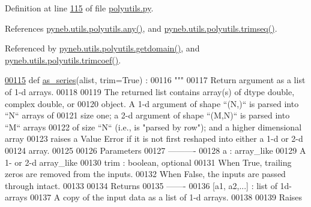 Definition at line \hyperlink{polyutils_8py_source_l00115}{115} of file \hyperlink{polyutils_8py_source}{polyutils.\+py}.



References \hyperlink{polyutils_8py_source_l00076}{pyneb.\+utils.\+polyutils.\+any()}, and \hyperlink{polyutils_8py_source_l00085}{pyneb.\+utils.\+polyutils.\+trimseq()}.



Referenced by \hyperlink{polyutils_8py_source_l00236}{pyneb.\+utils.\+polyutils.\+getdomain()}, and \hyperlink{polyutils_8py_source_l00182}{pyneb.\+utils.\+polyutils.\+trimcoef()}.


\begin{DoxyCode}
\hypertarget{namespacepyneb_1_1utils_1_1polyutils_l00115}{}\hyperlink{namespacepyneb_1_1utils_1_1polyutils_a9c3751d438f0f75922155c7823fe2699}{00115} \textcolor{keyword}{def }\hyperlink{namespacepyneb_1_1utils_1_1polyutils_a9c3751d438f0f75922155c7823fe2699}{as\_series}(alist, trim=True) :
00116     \textcolor{stringliteral}{"""}
00117 \textcolor{stringliteral}{    Return argument as a list of 1-d arrays.}
00118 \textcolor{stringliteral}{}
00119 \textcolor{stringliteral}{    The returned list contains array(s) of dtype double, complex double, or}
00120 \textcolor{stringliteral}{    object.  A 1-d argument of shape ``(N,)`` is parsed into ``N`` arrays of}
00121 \textcolor{stringliteral}{    size one; a 2-d argument of shape ``(M,N)`` is parsed into ``M`` arrays}
00122 \textcolor{stringliteral}{    of size ``N`` (i.e., is "parsed by row"); and a higher dimensional array}
00123 \textcolor{stringliteral}{    raises a Value Error if it is not first reshaped into either a 1-d or 2-d}
00124 \textcolor{stringliteral}{    array.}
00125 \textcolor{stringliteral}{}
00126 \textcolor{stringliteral}{    Parameters}
00127 \textcolor{stringliteral}{    ----------}
00128 \textcolor{stringliteral}{    a : array\_like}
00129 \textcolor{stringliteral}{        A 1- or 2-d array\_like}
00130 \textcolor{stringliteral}{    trim : boolean, optional}
00131 \textcolor{stringliteral}{        When True, trailing zeros are removed from the inputs.}
00132 \textcolor{stringliteral}{        When False, the inputs are passed through intact.}
00133 \textcolor{stringliteral}{}
00134 \textcolor{stringliteral}{    Returns}
00135 \textcolor{stringliteral}{    -------}
00136 \textcolor{stringliteral}{    [a1, a2,...] : list of 1d-arrays}
00137 \textcolor{stringliteral}{        A copy of the input data as a list of 1-d arrays.}
00138 \textcolor{stringliteral}{}
00139 \textcolor{stringliteral}{    Raises}

\end{DoxyCode}
